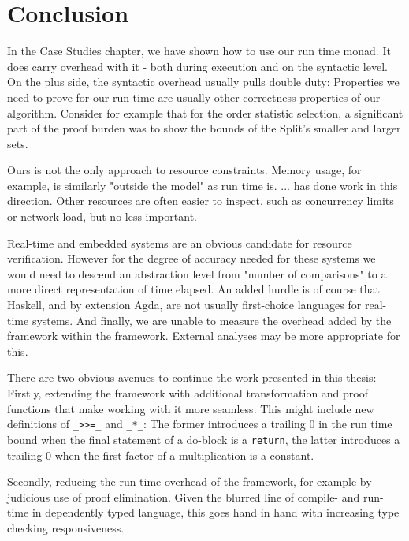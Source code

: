 
\chapter{Conclusion}
In the Case Studies chapter, we have shown how to use our run time monad. It does carry overhead with it - both during execution and on the syntactic level. On the plus side, the syntactic overhead usually pulls double duty: Properties we need to prove for our run time are usually other correctness properties of our algorithm. Consider for example that for the order statistic selection, a significant part of the proof burden was to show the bounds of the Split's smaller and larger sets.

Ours is not the only approach to resource constraints. Memory usage, for example, is similarly "outside the model" as run time is. ...  has done work in this direction. Other resources are often easier to inspect, such as concurrency limits or network load, but no less important.

Real-time and embedded systems are an obvious candidate for resource verification. However for the degree of accuracy needed for these systems we would need to descend an abstraction level from "number of comparisons" to a more direct representation of time elapsed. An added hurdle is of course that Haskell, and by extension Agda, are not usually first-choice languages for real-time systems. And finally, we are unable to measure the overhead added by the framework within the framework. External analyses may be more appropriate for this.

There are two obvious avenues to continue the work presented in this thesis: Firstly, extending the framework with additional transformation and proof functions that make working with it more seamless. This might include new definitions of \texttt{\_>>=\_} and \texttt{\_*\_}: The former introduces a trailing $0$ in the run time bound when the final statement of a do-block is a \texttt{return}, the latter introduces a trailing $0$ when the first factor of a multiplication is a constant.

Secondly, reducing the run time overhead of the framework, for example by judicious use of proof elimination. Given the blurred line of compile- and run-time in dependently typed language, this goes hand in hand with increasing type checking responsiveness.